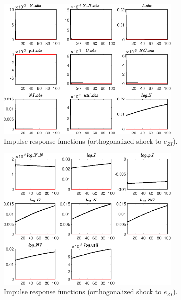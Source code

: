 \begin{figure}[H]
\centering 
\includegraphics[width=0.80\textwidth]{BRS_imp_mobility_alt/graphs/BRS_imp_mobility_alt_IRF_e_ZI1}
\caption{Impulse response functions (orthogonalized shock to ${e_{ZI}}$).}\label{Fig:IRF:e_ZI:1}
\end{figure}
 
\begin{figure}[H]
\centering 
\includegraphics[width=0.80\textwidth]{BRS_imp_mobility_alt/graphs/BRS_imp_mobility_alt_IRF_e_ZI2}
\caption{Impulse response functions (orthogonalized shock to ${e_{ZI}}$).}\label{Fig:IRF:e_ZI:2}
\end{figure}
 
